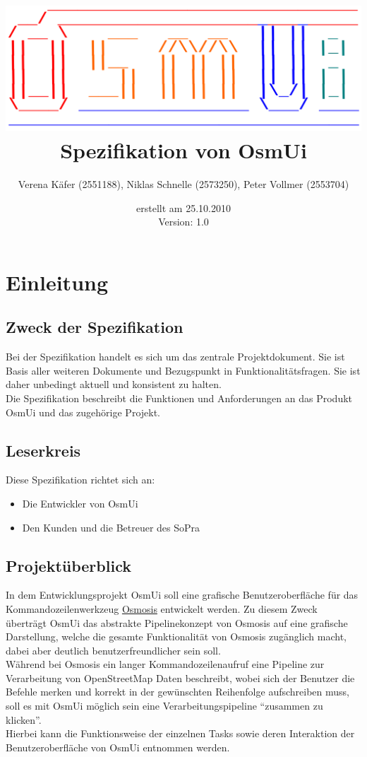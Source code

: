 \documentclass[a4paper,10pt]{scrartcl}
\author{Verena Käfer (2551188), Niklas Schnelle (2573250), Peter Vollmer (2553704)}
\date{erstellt am 25.10.2010\\
Version: 1.0}
\title{\includegraphics[width=15cm]{../projektplan/Logo_Osmui.png} \\ 
Spezifikation von OsmUi}
\begin{document}
\maketitle
\newpage
\tableofcontents
\newpage

\section{Einleitung}
\subsection{Zweck der Spezifikation}
Bei der Spezifikation handelt es sich um das zentrale Projektdokument. Sie ist Basis aller weiteren Dokumente und
Bezugspunkt in Funktionalitätsfragen. Sie ist daher unbedingt aktuell und konsistent zu halten.\\
Die Spezifikation beschreibt die Funktionen und Anforderungen an das Produkt OsmUi und das zugehörige Projekt.
\subsection{Leserkreis}
Diese Spezifikation richtet sich an:
\begin{itemize}
 \item Die Entwickler von OsmUi
 \item Den Kunden und die Betreuer des SoPra
\end{itemize}

\subsection{Projektüberblick}
In dem Entwicklungsprojekt OsmUi soll eine grafische Benutzeroberfläche für das Kommandozeilenwerkzeug \href{http://wiki.openstreetmap.org/wiki/Osmosis}{Osmosis}
entwickelt werden. Zu diesem Zweck überträgt OsmUi das abstrakte Pipelinekonzept von Osmosis auf eine grafische Darstellung, welche die gesamte Funktionalität von Osmosis zugänglich macht, dabei aber deutlich benutzerfreundlicher sein soll.\\
Während bei Osmosis ein langer Kommandozeilenaufruf eine Pipeline zur Verarbeitung von OpenStreetMap Daten beschreibt, wobei sich der Benutzer die Befehle merken
und korrekt in der gewünschten Reihenfolge aufschreiben muss, soll es mit OsmUi möglich sein eine Verarbeitungspipeline ``zusammen zu klicken''.\\
Hierbei kann die Funktionsweise der einzelnen Tasks sowie deren Interaktion der Benutzeroberfläche von OsmUi entnommen werden.
\end{document}
